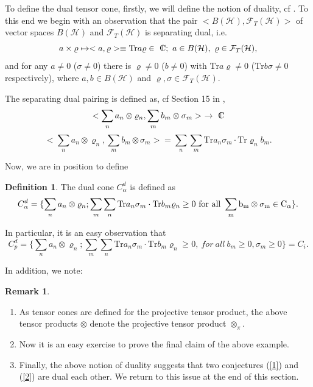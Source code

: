 \documentclass{amsart}
\theoremstyle{plain}
\theoremstyle{definition}
\newtheorem{defn}[thm]{Definition}
\newtheorem{rem}[thm]{Remark}
\newcommand{\cH}{\mathcal{H}}
\newcommand{\Tr}{\mathrm{Tr}}
\newcommand{\Cn}{{\setbox0=\hbox{
$\displaystyle\rm C$}\hbox{\hbox
to0pt{\kern0.6\wd0\vrule height0.9\ht0\hss}\box0}}} %
\begin{document}
To define the dual tensor cone, firstly,  we will define the notion of duality, cf \cite{DF}. To this end we begin with an observation that the pair  $<B(\cH), \mathcal{F}_T(\cH)>$ of vector spaces $B(\cH)$ and $\mathcal{F}_T(\cH)$ is separating dual, i.e. 
\begin{equation}
a \times \varrho \mapsto <a, \varrho> \equiv \Tr a \varrho \in \Cn; \  a \in B(\cH), \  \varrho \in \mathcal{F}_T(\cH),
\end{equation}
and for any $a\neq0$ ($\sigma \neq0$) there is $\varrho \neq0$ ($b \neq0$) with $\Tr a \varrho \neq 0$ ($\Tr b \sigma \neq 0$ respectively), where $a,b \in B(\cH)$ and $\varrho, \sigma \in \mathcal{F}_T(\cH)$.

The separating dual pairing is defined as, cf Section 15 in \cite{DF},
$$ <\sum_n a_n \otimes \varrho_n, \sum_m b_m \otimes \sigma_m> \ \to \Cn$$
\begin{equation}
<\sum_na_n \otimes \varrho_n, \sum_m b_m \otimes \sigma_m> = \sum_n \sum_m \Tr a_n\sigma_m \cdot \Tr\varrho_n b_m.
\end{equation}

Now, we are in position to define 
\begin{defn}
The dual cone $C^d_{\alpha}$  is defined as
\begin{equation}
C^d_{\alpha} = \{ \sum_n a_n \otimes \varrho_n; \sum_m \sum_n \Tr a_n \sigma_m \cdot \Tr b_m \varrho_n \geq 0 \ \rm{for \ all} \ \sum_m b_m \otimes \sigma_m \in C_{\alpha} \}.
\end{equation}
\end{defn} 

In particular, it is an easy observation that
\begin{equation}
C^d_p = \{  \sum_n a_n \otimes \varrho_n; \sum_m \sum_n \Tr a_n \sigma_m \cdot \Tr b_m \varrho_n \geq 0, 
\ {for \ all} \ b_m \geq0, \sigma_m \geq 0 \} = C_i.
\end{equation} 

In addition, we note:
\begin{rem} 
\begin{enumerate}
\item  As tensor cones are defined  for  the projective tensor product, the above tensor products $\otimes$ denote  the projective tensor product $\otimes_{\pi}$.
\item Now it is an easy exercise to prove the final claim of the above example.
\item Finally, the above notion of duality suggests that two conjectures (\ref{1}) and (\ref{2}) are dual each other.
 We return to this issue at the end of this section.
\end{enumerate}
\end{rem}
\end{document}
